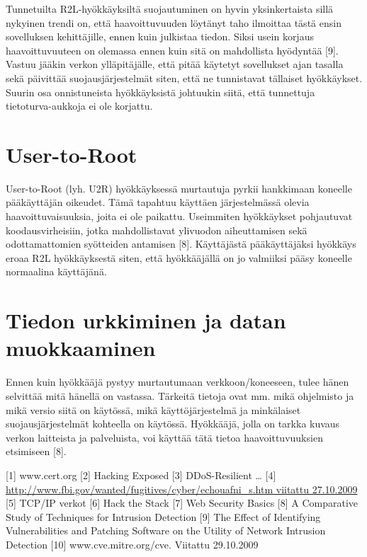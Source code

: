 Tunnetuilta R2L-hyökkäyksiltä suojautuminen on hyvin yksinkertaista
sillä nykyinen trendi on, että haavoittuvuuden löytänyt taho ilmoittaa
tästä ensin sovelluksen kehittäjille, ennen kuin julkistaa
tiedon. Siksi usein korjaus haavoittuvuuteen on olemassa ennen kuin
sitä on mahdollista hyödyntää [9]. Vastuu jääkin verkon ylläpitäjälle,
että pitää käytetyt sovellukset ajan tasalla sekä päivittää
suojausjärjestelmät siten, että ne tunnistavat tällaiset
hyökkäykset. Suurin osa onnistuneista hyökkäyksistä johtuukin siitä,
että tunnettuja tietoturva-aukkoja ei ole korjattu.

\section{User-to-Root}

User-to-Root (lyh. U2R) hyökkäyksessä murtautuja pyrkii hankkimaan
koneelle pääkäyttäjän oikeudet. Tämä tapahtuu käyttäen järjestelmässä
olevia haavoittuvaisuuksia, joita ei ole paikattu. Useimmiten
hyökkäykset pohjautuvat koodausvirheisiin, jotka mahdollistavat
ylivuodon aiheuttamisen sekä odottamattomien syötteiden antamisen
[8]. Käyttäjästä pääkäyttäjäksi hyökkäys eroaa R2L hyökkäyksestä
siten, että hyökkääjällä on jo valmiiksi pääsy koneelle normaalina
käyttäjänä.

\section{Tiedon urkkiminen ja datan muokkaaminen}

Ennen kuin hyökkääjä pystyy murtautumaan verkkoon/koneeseen, tulee
hänen selvittää mitä hänellä on vastassa. Tärkeitä tietoja ovat
mm. mikä ohjelmisto ja mikä versio siitä on käytössä, mikä
käyttöjärjestelmä ja minkälaiset suojausjärjestelmät kohteella on
käytössä. Hyökkääjä, jolla on tarkka kuvaus verkon laitteista ja
palveluista, voi käyttää tätä tietoa haavoittuvuuksien etsimiseen [8].

[1] www.cert.org
[2] Hacking Exposed
[3] DDoS-Resilient …
[4] \url{http://www.fbi.gov/wanted/fugitives/cyber/echouafni_s.htm viitattu 27.10.2009}
[5] TCP/IP verkot
[6] Hack the Stack
[7] Web Security Basics
[8] A Comparative Study of Techniques for Intrusion Detection
[9] The Effect of Identifying Vulnerabilities and Patching Software on the Utility of Network Intrusion Detection
[10] www.cve.mitre.org/cve. Viitattu 29.10.2009
